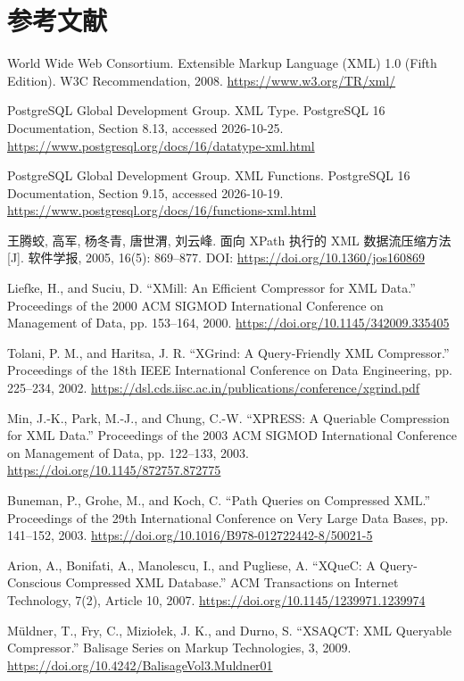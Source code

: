\chapter*{参考文献}
\pagestyle{postref}
\begin{enumerate}[label={[\arabic*]},leftmargin=2em,itemsep=0.4em]
\item World Wide Web Consortium. Extensible Markup Language (XML) 1.0 (Fifth Edition). W3C Recommendation, 2008. \url{https://www.w3.org/TR/xml/}
\item PostgreSQL Global Development Group. XML Type. PostgreSQL 16 Documentation, Section 8.13, accessed 2026-10-25. \url{https://www.postgresql.org/docs/16/datatype-xml.html}
\item PostgreSQL Global Development Group. XML Functions. PostgreSQL 16 Documentation, Section 9.15, accessed 2026-10-19. \url{https://www.postgresql.org/docs/16/functions-xml.html}
\item 王腾蛟, 高军, 杨冬青, 唐世渭, 刘云峰. 面向 XPath 执行的 XML 数据流压缩方法[J]. 软件学报, 2005, 16(5): 869--877. DOI: \url{https://doi.org/10.1360/jos160869}
\item Liefke, H., and Suciu, D. “XMill: An Efficient Compressor for XML Data.” Proceedings of the 2000 ACM SIGMOD International Conference on Management of Data, pp. 153--164, 2000. \url{https://doi.org/10.1145/342009.335405}
\item Tolani, P. M., and Haritsa, J. R. “XGrind: A Query-Friendly XML Compressor.” Proceedings of the 18th IEEE International Conference on Data Engineering, pp. 225--234, 2002. \url{https://dsl.cds.iisc.ac.in/publications/conference/xgrind.pdf}
\item Min, J.-K., Park, M.-J., and Chung, C.-W. “XPRESS: A Queriable Compression for XML Data.” Proceedings of the 2003 ACM SIGMOD International Conference on Management of Data, pp. 122--133, 2003. \url{https://doi.org/10.1145/872757.872775}
\item Buneman, P., Grohe, M., and Koch, C. “Path Queries on Compressed XML.” Proceedings of the 29th International Conference on Very Large Data Bases, pp. 141--152, 2003. \url{https://doi.org/10.1016/B978-012722442-8/50021-5}
\item Arion, A., Bonifati, A., Manolescu, I., and Pugliese, A. “XQueC: A Query-Conscious Compressed XML Database.” ACM Transactions on Internet Technology, 7(2), Article 10, 2007. \url{https://doi.org/10.1145/1239971.1239974}
\item Müldner, T., Fry, C., Miziołek, J. K., and Durno, S. “XSAQCT: XML Queryable Compressor.” Balisage Series on Markup Technologies, 3, 2009. \url{https://doi.org/10.4242/BalisageVol3.Muldner01}

\end{enumerate}
